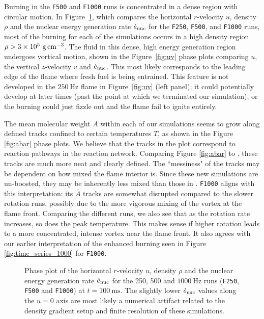 \documentclass[preprint,times,tighten]{aastex63}
\begin{document}
Burning in the {\tt F500} and {\tt F1000} runs is concentrated in a dense region with circular 
motion. In Figure~\ref{fig:urho}, which compares the horizontal $r$-velocity $u$, density $\rho$ and the 
nuclear energy generation rate $\dot{e}_{\rm nuc}$ for the {\tt F250}, {\tt F500}, and {\tt F1000} 
runs, most of the burning for each of the simulations occurs in a high density region $\rho > 3 
\times 10^5~{\rm g\,cm^{-3}}$. The fluid in this dense, high energy generation region undergoes 
vortical motion, shown in the Figure~\ref{fig:uv} phase plots comparing $u$, the vertical $z$-velocity $v$ and $\dot{e}_{\rm 
nuc}$. This most likely corresponds to the leading edge of the flame where fresh fuel is being entrained.
This feature is not developed in the $250~\mathrm{Hz}$ flame in Figure~\ref{fig:uv} (left panel); it could potentially develop 
at later times (past the point at which we terminated our simulation), or the burning could just 
fizzle out and the flame fail to ignite entirely. 

The mean molecular weight $\bar{A}$ within each of our simulations seems to grow along defined tracks confined to certain temperatures $T$, as shown in the Figure \ref{fig:abar} phase plots. We believe that the tracks in the plot correspond to reaction pathways in the reaction network. Comparing Figure \ref{fig:abar} to \citet{flame_wave1}, these tracks are much more neat and clearly defined. The ``messiness" of the tracks may be dependent on how mixed the flame interior is. Since these new simulations are un-boosted, they may be inherently less mixed than those in \citet{flame_wave1}. {\tt F1000} aligns with this interpretation: its $\bar{A}$ tracks are somewhat disrupted compared to the slower rotation runs, possibly due to the more vigorous mixing of the vortex at the flame front. Comparing the different runs, we also see that as the rotation rate increases, so does the peak temperature. This makes sense if higher rotation leads to a more concentrated, intense vortex near the flame front. It also agrees with our earlier interpretation of the enhanced burning seen in Figure \ref{fig:time_series_1000} for {\tt F1000}. 

\begin{figure}[t]
    \centering
    \caption{\label{fig:urho}Phase plot of the horizontal $r$-velocity $u$, density $\rho$ and the nuclear energy generation rate $\dot{e}_{\rm nuc}$ for the 250, 500 and $1000~\mathrm{Hz}$ runs ({\tt F250}, {\tt F500} and {\tt F1000}) at $t = 100~\mathrm{ms}$. The slightly lower $\dot{e}_{\rm nuc}$ values along the $u = 0$ axis are most likely a numerical artifact related to the density gradient setup and finite resolution of these simulations.}
\end{figure}
\end{document}
